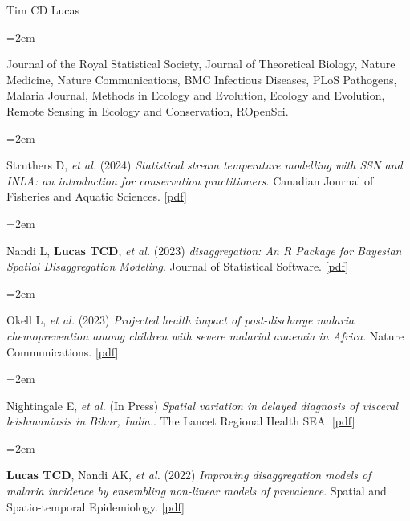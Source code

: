 \documentclass{scrartcl}
\newcommand{\MarginText}[1]{\marginpar{\raggedleft\itshape\small#1}} %
\newcommand{\Description}[1]{\hangindent=2em\hangafter=0\noindent\raggedright\footnotesize{#1}\par\normalsize\vspace{1em}} %
\begin{document}
\begin{cv}{Tim {\Large CD} Lucas}
\vspace{-0.5em} %


\Description{Journal of the Royal Statistical Society, Journal of Theoretical Biology, Nature Medicine, Nature Communications, BMC Infectious Diseases, PLoS Pathogens, Malaria Journal, Methods in Ecology and Evolution, Ecology and Evolution, Remote Sensing in Ecology and Conservation, ROpenSci.}




\vspace{1em} %

{\color{Maroon}}\vspace{1em}


\Description{\MarginText{2024}Struthers D, \emph{et al.} (2024) \emph{Statistical stream temperature modelling with SSN and INLA: an introduction for conservation practitioners}. Canadian Journal of Fisheries and Aquatic Sciences. [\href{https://cdnsciencepub.com/doi/full/10.1139/cjfas-2023-0136}{pdf}]}


\Description{\MarginText{2023}Nandi L, \textbf{Lucas TCD}, \emph{et al.} (2023) \emph{disaggregation: An R Package for Bayesian Spatial Disaggregation Modeling}. Journal of Statistical Software. [\href{https://www.jstatsoft.org/article/view/v106i11}{pdf}]}

\Description{Okell L, \emph{et al.} (2023) \emph{Projected health impact of post-discharge malaria chemoprevention among children with severe malarial anaemia in Africa}. Nature Communications. [\href{https://www.nature.com/articles/s41467-023-35939-w}{pdf}]}


\Description{Nightingale E, \emph{et al.} (In Press) \emph{Spatial variation in delayed diagnosis of visceral leishmaniasis in Bihar, India.}. The Lancet Regional Health SEA. [\href{https://papers.ssrn.com/sol3/papers.cfm?abstract_id=4233127}{pdf}]}



\Description{\MarginText{2022}\textbf{Lucas TCD}, Nandi AK,  \emph{et al.} (2022) \emph{ Improving disaggregation models of malaria incidence by ensembling non-linear models of prevalence}. Spatial and Spatio-temporal Epidemiology. [\href{https://reader.elsevier.com/reader/sd/pii/S1877584520300356?token=A7B0EF0114C0A057AD7F1E13B7F97FE4D359B945C1F09211AC50B77D272216014E3E9881E3FBFC7D3CA8A8DD5A78846A}{pdf}]}



\end{cv}
\end{document}
